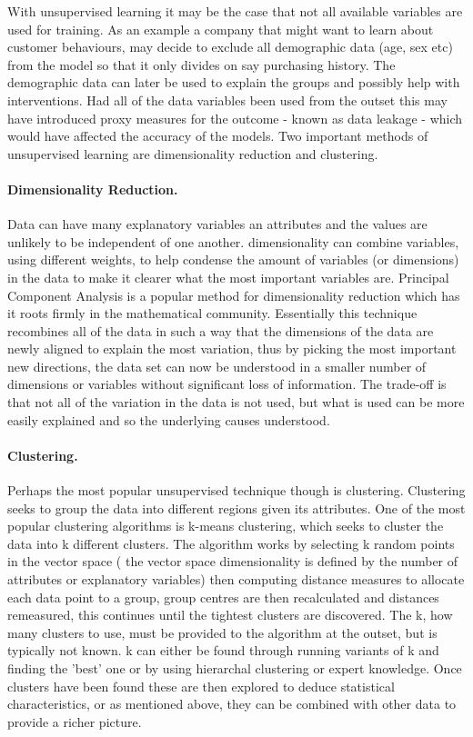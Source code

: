 With unsupervised learning it may be the case that not all available variables are used for training. As an example a company that might want to learn about customer behaviours, may decide to exclude all demographic data (age, sex etc) from the model so that it only divides on say purchasing history. The demographic data can later be used to explain the groups and possibly help with interventions. Had all of the data variables been used from the outset this may have introduced  proxy measures for the outcome - known as data leakage - which would have affected the accuracy of the models. Two important methods of unsupervised learning are dimensionality reduction and clustering.


\paragraph{Dimensionality Reduction.} Data can have many explanatory variables an attributes and the values are unlikely to be independent of  one another. dimensionality can combine variables, using different weights, to help condense the amount of variables (or dimensions) in the data to make it clearer what the most important variables are. Principal Component Analysis is a popular method for dimensionality reduction which has it roots firmly in the mathematical community. Essentially this technique recombines all of the data in such a way that the dimensions of the data are newly aligned to explain the most variation, thus by picking the most important new directions, the data set can now be understood in a smaller number of dimensions or variables without significant loss of information. The trade-off is that not all of the variation in the data is not used, but what is used can be more easily explained and so the underlying causes understood.


\paragraph{Clustering.} Perhaps the most popular unsupervised technique though is clustering. Clustering seeks to group the data into different regions given its attributes. One of the most popular clustering algorithms is k-means clustering, which seeks to cluster the data into k different clusters. The algorithm works by selecting k random points in the vector space ( the vector space dimensionality is defined by the number of attributes or explanatory variables) then computing  distance measures to allocate each data point to a group, group centres are then recalculated and distances remeasured, this continues until the tightest clusters are discovered. The k, how many clusters to use, must be provided to the algorithm at the outset, but is typically not known. k can either be found through running variants of k and finding the 'best' one or by using hierarchal clustering or expert knowledge. Once clusters have been found these are then explored to deduce statistical characteristics, or as mentioned above, they can be combined with other data to provide a richer picture.


